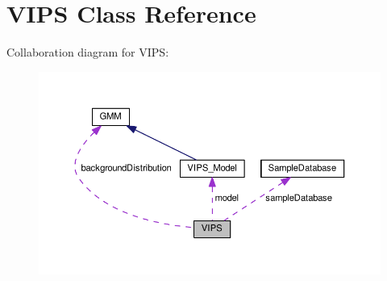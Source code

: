\hypertarget{classVIPS}{}\section{V\+I\+PS Class Reference}
\label{classVIPS}


Collaboration diagram for V\+I\+PS\+:
\nopagebreak
\begin{figure}[H]
\begin{center}
\leavevmode
\includegraphics[width=350pt]{classVIPS__coll__graph}
\end{center}
\end{figure}
